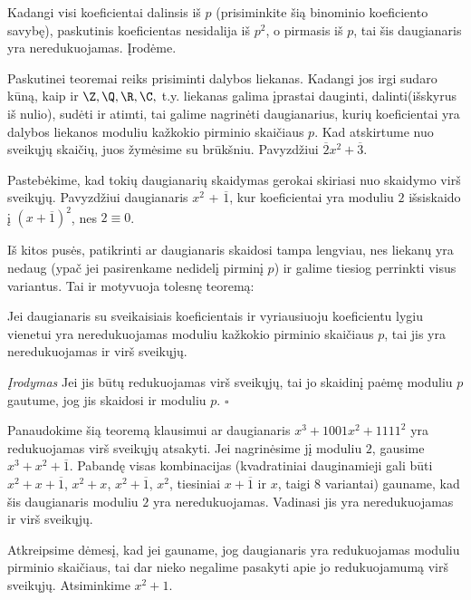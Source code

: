 Kadangi visi koeficientai dalinsis iš $p$ (prisiminkite šią binominio
koeficiento savybę), paskutinis koeficientas nesidalija iš $p^2$, o
pirmasis iš $p$, tai šis daugianaris yra neredukuojamas. Įrodėme.

Paskutinei teoremai reiks prisiminti dalybos liekanas. Kadangi jos irgi
sudaro kūną, kaip ir $\Z, \Q, \R, \C,$ t.y. liekanas galima įprastai
dauginti, dalinti(išskyrus iš nulio), sudėti ir atimti, tai galime
nagrinėti daugianarius, kurių koeficientai yra dalybos liekanos moduliu
kažkokio pirminio skaičiaus $p$. Kad atskirtume nuo sveikųjų skaičių, juos
žymėsime su brūkšniu. Pavyzdžiui $\overline{2}x^2 + \overline{3}$.

Pastebėkime, kad tokių daugianarių skaidymas gerokai skiriasi nuo skaidymo
virš sveikųjų. Pavyzdžiui daugianaris $x^2$ + $\overline{1}$, kur
koeficientai yra moduliu $2$ išsiskaido į $(x+\overline{1})^2$, nes $2
\equiv 0$.  

Iš kitos pusės, patikrinti ar daugianaris skaidosi tampa lengviau, nes
liekanų yra nedaug (ypač jei pasirenkame nedidelį pirminį $p$) ir galime
tiesiog perrinkti visus variantus. Tai ir motyvuoja tolesnę teoremą:

    
\begin{thm} Jei daugianaris su sveikaisiais koeficientais ir vyriausiuoju
  koeficientu lygiu vienetui yra neredukuojamas moduliu kažkokio pirminio
  skaičiaus $p$, tai jis yra neredukuojamas ir virš sveikųjų.  \end{thm}



\emph{Įrodymas} Jei jis būtų redukuojamas virš sveikųjų, tai jo skaidinį
paėmę moduliu $p$ gautume, jog jis skaidosi ir moduliu $p$.  $\square$

Panaudokime šią teoremą klausimui ar daugianaris $x^3+1001x^2 + 1111^2$ yra
redukuojamas virš sveikųjų atsakyti. Jei nagrinėsime jį moduliu $2$,
gausime $x^3 + x^2 + \overline{1}$. Pabandę visas kombinacijas
(kvadratiniai dauginamieji gali būti $x^2 + x + \overline{1}$, $x^2 + x$,
$x^2 + \overline{1}$, $x^2$, tiesiniai $x+\overline{1}$ ir $x$, taigi $8$
variantai) gauname, kad šis daugianaris moduliu $2$ yra neredukuojamas.
Vadinasi jis yra neredukuojamas ir virš sveikųjų.
  
Atkreipsime dėmesį, kad jei gauname, jog daugianaris yra redukuojamas
moduliu pirminio skaičiaus, tai dar nieko negalime pasakyti apie jo
redukuojamumą virš sveikųjų. Atsiminkime $x^2 + 1$. 


\newpage

